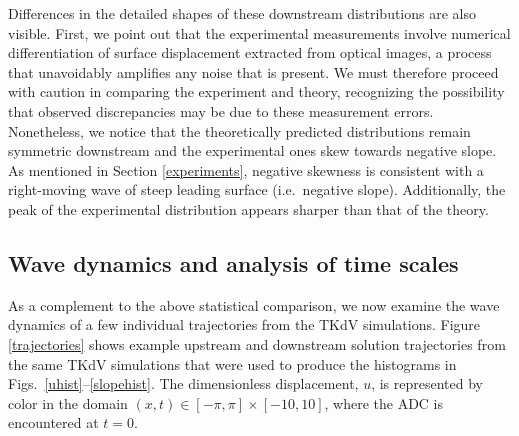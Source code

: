\documentclass[11pt]{article}
\begin{document}
	Differences in the detailed shapes of these downstream distributions are also visible. First, we point out that the experimental measurements involve numerical differentiation of  surface displacement extracted from optical images, a process that unavoidably amplifies any noise that is present. We must therefore proceed with caution in comparing the experiment and theory, recognizing the possibility that observed discrepancies may be due to these measurement errors. Nonetheless, we notice that the theoretically predicted distributions remain symmetric downstream and the experimental ones skew towards negative slope. As mentioned in Section \ref{experiments}, negative skewness is consistent with a right-moving wave of steep leading surface (i.e.~negative slope). Additionally, the peak of the experimental distribution appears sharper than that of the theory.



\subsection{Wave dynamics and analysis of time scales}

	As a complement to the above statistical comparison, we now examine the wave dynamics of a few individual trajectories from the TKdV simulations. Figure \ref{trajectories} shows example upstream and downstream solution trajectories from the same TKdV simulations that were used to produce the histograms in Figs.~\ref{uhist}--\ref{slopehist}. The dimensionless displacement, $u$, is represented by color in the domain $(x,t) \in [-\pi,\pi] \times [-10,10]$, where the ADC is encountered at $t=0$. 
	
\end{document}
